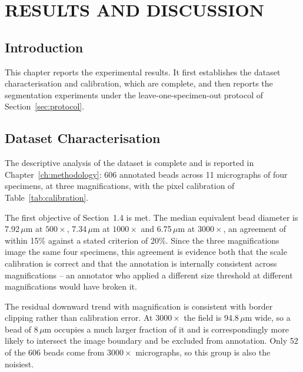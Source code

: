 \chapter{RESULTS AND DISCUSSION}
\label{ch:results}

%
%

\section{Introduction}

This chapter reports the experimental results. It first establishes the dataset
characterisation and calibration, which are complete, and then reports the
segmentation experiments under the leave-one-specimen-out protocol of
Section~\ref{sec:protocol}.

\section{Dataset Characterisation}

The descriptive analysis of the dataset is complete and is reported in
Chapter~\ref{ch:methodology}: 606 annotated beads across 11 micrographs of four
specimens, at three magnifications, with the pixel calibration of
Table~\ref{tab:calibration}.

The first objective of Section~1.4 is met. The median equivalent bead diameter is
7.92\,$\mu$m at $500\times$, 7.34\,$\mu$m at $1000\times$ and 6.75\,$\mu$m at
$3000\times$, an agreement of within 15\% against a stated criterion of 20\%. Since
the three magnifications image the same four specimens, this agreement is evidence
both that the scale calibration is correct and that the annotation is internally
consistent across magnifications -- an annotator who applied a different size
threshold at different magnifications would have broken it.

The residual downward trend with magnification is consistent with border clipping
rather than calibration error. At $3000\times$ the field is 94.8\,$\mu$m wide, so a
bead of 8\,$\mu$m occupies a much larger fraction of it and is correspondingly more
likely to intersect the image boundary and be excluded from annotation. Only 52 of
the 606 beads come from $3000\times$ micrographs, so this group is also the noisiest.

